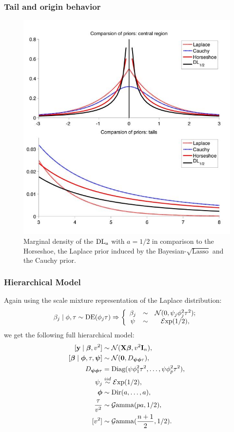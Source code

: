 \documentclass[10pt]{beamer}
\theoremstyle{plain}
\begin{document}
\begin{frame}
	\frametitle{Tail and origin behavior}
	\begin{figure}%
	\centering
\includegraphics[width = .6\textwidth]{Priors}
\caption{Marginal density of the $\text{\rm{DL}}_a$ with $a = 1/2$ in comparison to the Horseshoe, the Laplace prior induced by the Bayesian-$\sqrt{\text{Lasso}}$ and the Cauchy prior.}
\label{fig_priors}
	\end{figure}
\end{frame}

\begin{frame}
	\frametitle{Hierarchical Model}
	Again using the scale mixture representation of the Laplace distribution:\[ \beta_j \mid \phi , \tau \sim \text{\rm{DE}}(\phi_j \tau) \Rightarrow \left\{ \begin{array}{ccc}
\beta_j & \sim & \mathcal{N}(0 , \psi_j\phi^2_j\tau^2); \\
\psi & \sim & \mathcal{E}\mathrm{xp}(1/2),
\end{array} \right. \] we get the following full hierarchical model:
\begin{align*} \label{sq_dl_h}
[ \y \mid \bbeta, v^2 ] & \sim \NormRV(\X \bbeta, v^2 \I_n), \\
[\bbeta \mid \bphi, \tau , \bpsi ]  &\sim \NormRV(\0, D_{\bpsi \bphi \tau}), \\ D_{\bpsi \bphi \tau} &= \text{Diag}(\psi\phi_1^2\tau^2, \ldots, \psi\phi_p^2\tau^2), \\
\psi_j & \stackrel{iid}{\sim} \mathcal{E}\mathrm{xp}(1/2), \\
\bphi & \sim \text{\rm{Dir}}(a, \ldots ,a), \\
\frac{\tau}{v^2}  &\sim \mathcal{G}\mathrm{amma}(pa , 1/2), \\ 
[v^2] &\sim \mathcal{G}\mathrm{amma}(\frac{n+1}{2} , 1/2).  
\end{align*}
\end{frame}
\end{document}
